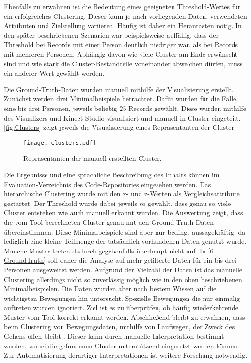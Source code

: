 Ebenfalls zu erwähnen ist die Bedeutung eines geeigneten Threshold-Wertes für ein erfolgreiches Clustering.
Dieser kann je nach vorliegenden Daten, verwendeten Attributen und Zielstellung variieren.
Häufig ist daher ein {\glqq Herantasten\grqq} nötig.
In den später beschriebenen Szenarien war beispielsweise auffällig,
dass der Threshold bei Records mit einer Person deutlich niedriger war,
als bei Records mit mehreren Personen.
Abhängig davon wie viele Cluster am Ende erwünscht sind
und wie stark die Cluster-Bestandteile voneinander abweichen dürfen,
muss ein anderer Wert gewählt werden.

Die Ground-Truth-Daten wurden manuell mithilfe der Visualisierung erstellt.
Zunächst werden drei Minimalbeispiele betrachtet.
Dafür wurden für die Fälle, eine bis drei Personen, jeweils beliebig 25 Records gewählt.
Diese wurden mithilfe des Visualizers und Kinect Studio visualisiert und manuell in Cluster eingeteilt.
\autoref{fig:Clusters} zeigt jeweils die Visualisierung eines Repräsentanten der Cluster.
\begin{figure}[ht]
    \begin{center}
    \texttt{[image: clusters.pdf]}
    \end{center}
    \caption{Repräsentanten der manuell erstellten Cluster.}
    \label{fig:Clusters}
\end{figure}
Die Ergebnisse und eine sprachliche Beschreibung des Inhalts
können im Evaluation-Verzeichnis des Code-Repositories eingesehen werden.
Das hierarchische Clustering wurde mit den x- und z-Werten als Vergleichsattribute gestartet.
Der Threshold wurde dabei jeweils so gewählt,
dass genau so viele Cluster entstehen wie auch manuell erkannt wurden.
Die Auswertung zeigt, dass die vom Tool berechneten Cluster genau mit den Ground-Truth-Daten übereinstimmen.
Diese Minimalbeispiele sind aber nur bedingt aussagekräftig,
da lediglich eine kleine Teilmenge der tatsächlich vorhandenen Daten genutzt wurde.
Manche Muster treten dadurch gegebenfalls überhaupt nicht auf.
In \autoref{6-GroundTruth} soll daher die Analyse auf mehr gefilterte Daten
für ein bis drei Personen ausgeweitet werden.
Aufgrund der Vielzahl der Daten ist das manuelle Clustering allerdings nicht so
zuverlässig möglich wie in den oben beschriebenen Minimalbeispielen.
Die Daten wurden aber nach bestem Wissen auf die wichtigsten Bewegungen hin untersucht.
Spezielle Bewegungen die nur einmalig auftreten wurden ignoriert.
Ziel ist es zu überprüfen,
ob häufig wiederkehrende Muster vom Tool korrekt erkannt werden.
Abschließend bleibt zu erwähnen,
dass beim Clustering von Bewegungsdaten, mithilfe von Laufwegen,
der Zweck des Gehens offen bleibt \citep{monastero_traces_2018}.
Dieser kann durch manuelle Interpretation bestimmt werden,
wobei die gefundenen Cluster unterstützend eingesetzt werden können.
Zur Automatisierung derartiger Interpretationen ist weitere Forschung notwendig.

